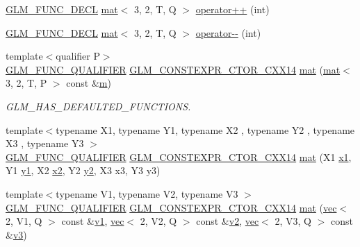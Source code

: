 \begin{DoxyCompactItemize}
\hyperlink{setup_8hpp_ab2d052de21a70539923e9bcbf6e83a51}{G\+L\+M\+\_\+\+F\+U\+N\+C\+\_\+\+D\+E\+CL} \hyperlink{structglm_1_1mat}{mat}$<$ 3, 2, T, Q $>$ \hyperlink{structglm_1_1mat_3_013_00_012_00_01_t_00_01_q_01_4_ac1de03304a1fcb496a374a06854e3d7a}{operator++} (int)
\item 
\hyperlink{setup_8hpp_ab2d052de21a70539923e9bcbf6e83a51}{G\+L\+M\+\_\+\+F\+U\+N\+C\+\_\+\+D\+E\+CL} \hyperlink{structglm_1_1mat}{mat}$<$ 3, 2, T, Q $>$ \hyperlink{structglm_1_1mat_3_013_00_012_00_01_t_00_01_q_01_4_a1d64f18f5052894c3ce72e27ddd23a19}{operator-\/-\/} (int)
\item 
{\footnotesize template$<$qualifier P$>$ }\\\hyperlink{setup_8hpp_a33fdea6f91c5f834105f7415e2a64407}{G\+L\+M\+\_\+\+F\+U\+N\+C\+\_\+\+Q\+U\+A\+L\+I\+F\+I\+ER} \hyperlink{setup_8hpp_a0900f9145e68bf6061b6f5e7be3fa751}{G\+L\+M\+\_\+\+C\+O\+N\+S\+T\+E\+X\+P\+R\+\_\+\+C\+T\+O\+R\+\_\+\+C\+X\+X14} \hyperlink{structglm_1_1mat_3_013_00_012_00_01_t_00_01_q_01_4_a0d749576b4014d88c52fe8df4b559333}{mat} (\hyperlink{structglm_1_1mat}{mat}$<$ 3, 2, T, P $>$ const \&\hyperlink{_s_d_l__opengl__glext_8h_af593500c283bf1a787a6f947f503a5c2}{m})
\begin{DoxyCompactList}\small\item\em G\+L\+M\+\_\+\+H\+A\+S\+\_\+\+D\+E\+F\+A\+U\+L\+T\+E\+D\+\_\+\+F\+U\+N\+C\+T\+I\+O\+NS. \end{DoxyCompactList}\item 
{\footnotesize template$<$typename X1, typename Y1, typename X2 , typename Y2 , typename X3 , typename Y3 $>$ }\\\hyperlink{setup_8hpp_a33fdea6f91c5f834105f7415e2a64407}{G\+L\+M\+\_\+\+F\+U\+N\+C\+\_\+\+Q\+U\+A\+L\+I\+F\+I\+ER} \hyperlink{setup_8hpp_a0900f9145e68bf6061b6f5e7be3fa751}{G\+L\+M\+\_\+\+C\+O\+N\+S\+T\+E\+X\+P\+R\+\_\+\+C\+T\+O\+R\+\_\+\+C\+X\+X14} \hyperlink{structglm_1_1mat_3_013_00_012_00_01_t_00_01_q_01_4_a83ed0230699667e599d391d6ccd411eb}{mat} (X1 \hyperlink{_s_d_l__opengl__glext_8h_a49825216c96caaeb09237b36651181c5}{x1}, Y1 \hyperlink{_s_d_l__opengl__glext_8h_a3af6c78fcdfccea028a5878bc747ef39}{y1}, X2 \hyperlink{_s_d_l__opengl__glext_8h_a7b907a03236685c534d89d604cff23c8}{x2}, Y2 \hyperlink{_s_d_l__opengl__glext_8h_a2be1135ed68e8d80fa9e130c7814f8c2}{y2}, X3 x3, Y3 y3)
\item 
{\footnotesize template$<$typename V1, typename V2, typename V3 $>$ }\\\hyperlink{setup_8hpp_a33fdea6f91c5f834105f7415e2a64407}{G\+L\+M\+\_\+\+F\+U\+N\+C\+\_\+\+Q\+U\+A\+L\+I\+F\+I\+ER} \hyperlink{setup_8hpp_a0900f9145e68bf6061b6f5e7be3fa751}{G\+L\+M\+\_\+\+C\+O\+N\+S\+T\+E\+X\+P\+R\+\_\+\+C\+T\+O\+R\+\_\+\+C\+X\+X14} \hyperlink{structglm_1_1mat_3_013_00_012_00_01_t_00_01_q_01_4_afe887fa3ecb498d777f704ccfbf90946}{mat} (\hyperlink{structglm_1_1vec}{vec}$<$ 2, V1, Q $>$ const \&\hyperlink{_s_d_l__opengl__glext_8h_a435c176a02c061b43e19bdf7c86cceae}{v1}, \hyperlink{structglm_1_1vec}{vec}$<$ 2, V2, Q $>$ const \&\hyperlink{_s_d_l__opengl__glext_8h_a0928f6d0f0f794ba000a21dfae422136}{v2}, \hyperlink{structglm_1_1vec}{vec}$<$ 2, V3, Q $>$ const \&\hyperlink{_s_d_l__opengl__glext_8h_acc806b31cbf466ceba6555983d8b814d}{v3})

\end{DoxyCompactItemize}
